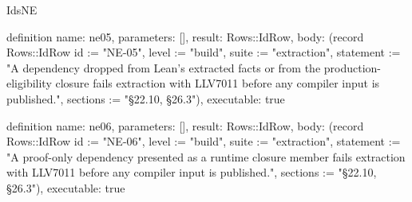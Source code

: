 \begin{lexlean}{IdsNE}
\begin{semanticmodule}
definition{
  name: ne05,
  parameters: [],
  result: Rows::IdRow,
  body: (record Rows::IdRow {id := "NE-05", level := "build", suite := "extraction", statement := "A dependency dropped from Lean's extracted facts or from the production-eligibility closure fails extraction with LLV7011 before any compiler input is published.", sections := "§22.10, §26.3"}),
  executable: true
}

definition{
  name: ne06,
  parameters: [],
  result: Rows::IdRow,
  body: (record Rows::IdRow {id := "NE-06", level := "build", suite := "extraction", statement := "A proof-only dependency presented as a runtime closure member fails extraction with LLV7011 before any compiler input is published.", sections := "§22.10, §26.3"}),
  executable: true
}
\end{semanticmodule}
\end{lexlean}
